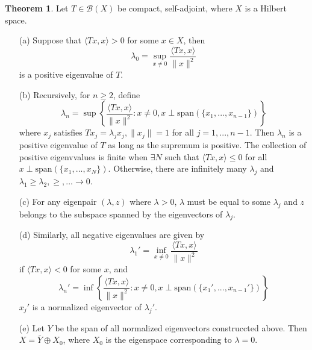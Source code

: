 \documentclass{article}
\theoremstyle{definition}
\newtheorem{thm}{Theorem}
\newcommand{\B}{\mathcal B}
\begin{document}
\begin{thm}
	Let $T \in \B(X)$ be compact, self-adjoint, where $X$ is a Hilbert space.
	\begin{enumerate}
		\item[(a)] Suppose that $\langle Tx, x \rangle > 0$ for some $x \in X$, then
			\[
				\lambda_0 = \sup_{x \neq 0} \frac{ \langle T x, x \rangle}{\|x\|^2}
			\]
			is a positive eigenvalue of $T$.

		\item[(b)] Recursively, for $n \geq 2$, define 
			\[
				\lambda_n = \sup \left\{\frac{\langle T x, x \rangle}{\|x\|^2}: x \neq 0, x \perp \text{span}(\{x_1, ..., x_{n - 1}\}) \right\}
			\]
			where $x_j$ satisfies $T x_j = \lambda_j x_j, \|x_j\| = 1$ for all $j = 1, ..., n - 1$.
			Then $\lambda_n$ is a positive eigenvalue of $T$ as long as the supremum is positive.
			The collection of positive eigenvvalues is finite when $\exists N$ such that $\langle T x, x \rangle \leq 0$ for all $x \perp \text{span}(\{x_1, ..., x_N\})$.
			Otherwise, there are infinitely many $\lambda_j$ and $\lambda_1 \geq \lambda_2, \geq, ... \to 0$.

		\item[(c)] For any eigenpair $(\lambda, z)$ where $\lambda > 0$, $\lambda$ must be equal to some $\lambda_j$ and $z$ belongs to the subspace spanned by the eigenvectors of $\lambda_j$.

		\item[(d)] Similarly, all negative eigenvalues are given by 
			\[
				\lambda_1' = \inf_{x \neq 0} \frac{\langle T x, x \rangle}{\|x\|^2}
			\]
			if $\langle T x, x \rangle < 0$ for some $x$, and 
			\[
				\lambda_n' = \inf \left\{ \frac{\langle T x, x \rangle}{\|x\|^2}: x \neq 0, x \perp \text{span}(\{x_1', ..., x_{n - 1}'\})\right\}
			\]
			$x_j'$ is a normalized eigenvector of $\lambda_j'$.

		\item[(e)] Let $Y$ be the span of all normalized eigenvectors construccted above.
			Then $X = \bar{Y} \oplus X_0$, where $X_0$ is the eigenspace corresponding to $\lambda = 0$.
	\end{enumerate}
\end{thm}
\end{document}
